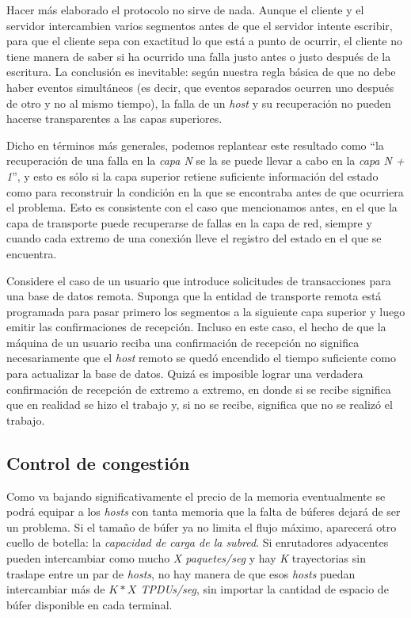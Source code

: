 \documentclass[10pt,a4paper]{report}
\begin{document}
	\par Hacer más elaborado el protocolo no sirve de nada. Aunque el cliente y el servidor intercambien varios segmentos antes de que el servidor intente escribir, para que el cliente sepa con exactitud lo que está a punto de ocurrir, el cliente no tiene manera de saber si ha ocurrido una falla justo antes o justo después de la escritura. La conclusión es inevitable: según nuestra regla básica de que no debe haber eventos simultáneos (es decir, que eventos separados ocurren uno después de otro y no al mismo tiempo), la falla de un \textit{host} y su recuperación no pueden hacerse transparentes a las capas superiores.

	\par Dicho en términos más generales, podemos replantear este resultado como “la recuperación de una falla en la \textit{capa N} se la se puede llevar a cabo en la \textit{capa N + 1}”, y esto es sólo si la capa superior retiene suficiente información del estado como para reconstruir la condición en la que se encontraba antes de que ocurriera el problema. Esto es consistente con el caso que mencionamos antes, en el que la capa de transporte puede recuperarse de fallas en la capa de red, siempre y cuando cada extremo de una conexión lleve el registro del estado en el que se encuentra.	
	
	\par Considere el caso de un usuario que introduce solicitudes de transacciones para una base de datos remota. Suponga que la entidad de transporte remota está programada para pasar primero los segmentos a la siguiente capa superior y luego emitir las confirmaciones de recepción. Incluso en este caso, el hecho de que la máquina de un usuario reciba una confirmación de recepción no significa necesariamente que el \textit{host} remoto se quedó encendido el tiempo suficiente como para actualizar la base de datos. Quizá es imposible lograr una verdadera confirmación de recepción de extremo a extremo, en donde si se recibe significa que en realidad se hizo el trabajo y, si no se recibe, significa que no se realizó el trabajo.

\subsection{Control de congestión}

	\par Como va bajando significativamente el precio de la memoria eventualmente se podrá equipar a los \textit{hosts} con tanta memoria que la falta de búferes dejará de ser un problema. Si el tamaño de búfer ya no limita el flujo máximo, aparecerá otro cuello de botella: la \textit{capacidad de carga de la subred}. Si enrutadores adyacentes pueden intercambiar como mucho \textit{X paquetes/seg} y hay \textit{K} trayectorias sin traslape entre un par de \textit{hosts}, no hay manera de que esos \textit{hosts} puedan intercambiar más de \textit{$K * X $  TPDUs/seg}, sin importar la cantidad de espacio de búfer disponible en cada terminal.
\end{document}
